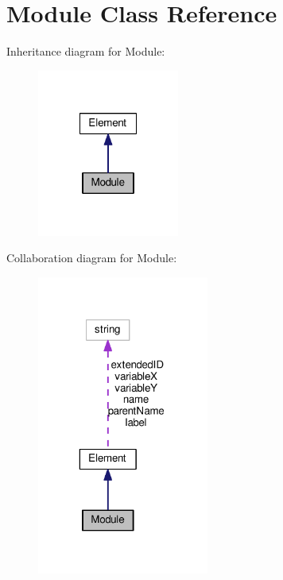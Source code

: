 \hypertarget{classModule}{\section{Module Class Reference}
\label{classModule}
}


Inheritance diagram for Module\+:\nopagebreak
\begin{figure}[H]
\begin{center}
\leavevmode
\includegraphics[width=132pt]{classModule__inherit__graph}
\end{center}
\end{figure}


Collaboration diagram for Module\+:\nopagebreak
\begin{figure}[H]
\begin{center}
\leavevmode
\includegraphics[width=160pt]{classModule__coll__graph}
\end{center}
\end{figure}
